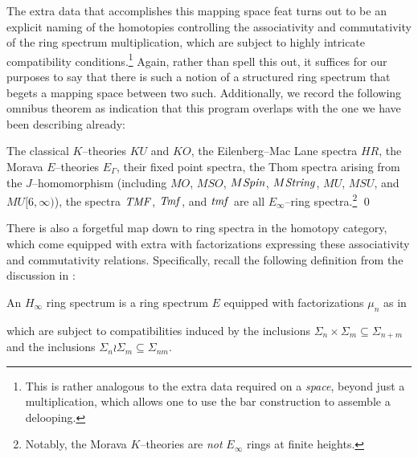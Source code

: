 The extra data that accomplishes this mapping space feat turns out to be an explicit naming of the homotopies controlling the associativity and commutativity of the ring spectrum multiplication, which are subject to highly intricate compatibility conditions.\footnote{This is rather analogous to the extra data required on a \emph{space}, beyond just a multiplication, which allows one to use the bar construction to assemble a delooping.}  Again, rather than spell this out, it suffices for our purposes to say that there is such a notion of a structured ring spectrum that begets a mapping space between two such.  Additionally, we record the following omnibus theorem as indication that this program overlaps with the one we have been describing already:
\begin{theorem}
The classical $K$--theories $KU$ and $KO$, the Eilenberg--Mac Lane spectra $HR$, the Morava $E$--theories $E_\Gamma$, their fixed point spectra, the Thom spectra arising from the $J$--homomorphism (including $MO$, $MSO$, $M\mathit{Spin}$, $M\mathit{String}$, $MU$, $MSU$, and $MU[6, \infty)$), the spectra $\mathit{TMF}$, $\mathit{Tmf}$, and $\mathit{tmf}$ are all $E_\infty$--ring spectra.\footnote{Notably, the Morava $K$--theories are \emph{not} $E_\infty$ rings at finite heights.} \qed
\end{theorem}

There is also a forgetful map down to ring spectra in the homotopy category, which come equipped with extra with factorizations expressing these associativity and commutativity relations.  Specifically, recall the following definition from the discussion in :

\begin{definition}
An $H_\infty$ ring spectrum is a ring spectrum $E$ equipped with factorizations $\mu_n$ as in
\begin{center}
\end{center}
which are subject to compatibilities induced by the inclusions $\Sigma_n \times \Sigma_m \subseteq \Sigma_{n+m}$ and the inclusions $\Sigma_n \wr \Sigma_m \subseteq \Sigma_{nm}$.
\end{definition}

